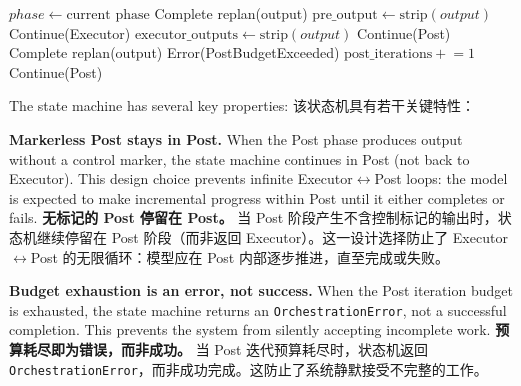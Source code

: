 \begin{algorithm}[t]
\caption{Phase state machine transition}
\label{alg:state}
\begin{algorithmic}[1]
  \State $phase \gets \text{current phase}$
      \State \Return Complete 
      \State \Return replan(output) 
    \Else
      \State $\text{pre\_output} \gets \text{strip}(output)$
      \State \Return Continue(Executor)
    \EndIf
    \State $\text{executor\_outputs} \gets \text{strip}(output)$
    \State \Return Continue(Post) 
  \Else {}
      \State \Return Complete
      \State \Return replan(output)
    \Else
        \State \Return Error(PostBudgetExceeded)
      \EndIf
      \State $\text{post\_iterations} \mathrel{+}= 1$
      \State \Return Continue(Post) 
    \EndIf
  \EndIf
\EndFunction
\end{algorithmic}
\end{algorithm}

The state machine has several key properties:
该状态机具有若干关键特性：

\textbf{Markerless Post stays in Post.} When the Post phase produces output without a control marker, the state machine continues in Post (not back to Executor). This design choice prevents infinite Executor$\leftrightarrow$Post loops: the model is expected to make incremental progress within Post until it either completes or fails.
\textbf{无标记的 Post 停留在 Post。} 当 Post 阶段产生不含控制标记的输出时，状态机继续停留在 Post 阶段（而非返回 Executor）。这一设计选择防止了 Executor$\leftrightarrow$Post 的无限循环：模型应在 Post 内部逐步推进，直至完成或失败。

\textbf{Budget exhaustion is an error, not success.} When the Post iteration budget is exhausted, the state machine returns an \texttt{OrchestrationError}, not a successful completion. This prevents the system from silently accepting incomplete work.
\textbf{预算耗尽即为错误，而非成功。} 当 Post 迭代预算耗尽时，状态机返回 \texttt{OrchestrationError}，而非成功完成。这防止了系统静默接受不完整的工作。


